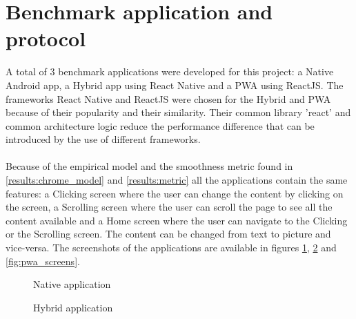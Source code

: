 \documentclass{kththesis}
\begin{document}
\section{Benchmark application and protocol}

A total of 3 benchmark applications were developed for this project: a Native Android app, a Hybrid app using React Native and a PWA using ReactJS. The frameworks React Native and ReactJS were chosen for the Hybrid and PWA because of their popularity and their similarity. Their common library 'react' and common architecture logic reduce the performance difference that can be introduced by the use of different frameworks.

\paragraph{}
Because of the empirical model and the smoothness metric found in \autoref{results:chrome_model} and \autoref{results:metric} all the applications contain the same features: a Clicking screen where the user can change the content by clicking on the screen, a Scrolling screen where the user can scroll the page to see all the content available and a Home screen where the user can navigate to the Clicking or the Scrolling screen. The content can be changed from text to picture and vice-versa. The screenshots of the applications are available in figures \ref{fig:native_screens}, \ref{fig:hybrid_screens} and \ref{fig:pwa_screens}.

\begin{figure}
    \centering
    \hfill
    \hfill
    \hfill
    \hfill
    \caption{Native application}
    \label{fig:native_screens}
\end{figure}

\begin{figure}
    \centering
    \hfill
    \hfill
    \hfill
    \hfill
    \caption{Hybrid application}
    \label{fig:hybrid_screens}
\end{figure}
\end{document}
